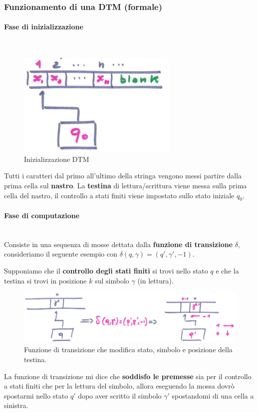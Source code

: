 \documentclass{article}
\begin{document}
\subsubsection{Funzionamento di una DTM (formale)}
\paragraph{Fase di inizializzazione}\mbox{}\\
\begin{figure}[H]
    \centering
    \includegraphics[scale=0.5]{images/dtm_init.png}
    \caption{Inizializzazione DTM}
\end{figure}
Tutti i caratteri dal primo all'ultimo della stringa vengono messi partire dalla prima cella
sul \textbf{nastro}. La \textbf{testina} di lettura/scrittura viene messa sulla prima cella
del nastro, il controllo a stati finiti viene impostato sullo stato iniziale $q_0$.

\paragraph{Fase di computazione}\mbox{}\\
Consiste in una sequenza di mosse dettata dalla \textbf{funzione di transizione} $\delta$, consideriamo
il seguente esempio con $\delta(q,\gamma)=(q',\gamma',-1)$.

Supponiamo che il \textbf{controllo
degli stati finiti} si trovi nello stato $q$ e che la testina si trovi in posizione $k$
sul simbolo $\gamma$ (in lettura).
\begin{figure}[H]
    \centering
    \includegraphics[scale=0.45]{images/dtm_comp.png}
    \caption{Funzione di transizione che modifica stato, simbolo e posizione della testina.}
\end{figure}
La funzione di transizione mi dice che \textbf{soddisfo le premesse} sia per il controllo a stati finiti
che per la lettura del simbolo, allora eseguendo la mossa dovrò spostarmi nello stato $q'$
dopo aver scritto il simbolo $\gamma'$ spostandomi di una cella a sinistra.
\end{document}
